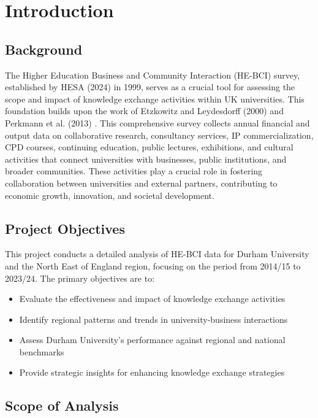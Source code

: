 \documentclass[journal,onecolumn, 10pt,draftclsnofoot]{IEEEtran}
\begin{document}
\section{Introduction}

\subsection{Background}

The Higher Education Business and Community Interaction (HE-BCI) survey, established by HESA (2024) \cite{hesa_he_bci_2024} in 1999, serves as a crucial tool for assessing the scope and impact of knowledge exchange activities within UK universities. This foundation builds upon the work of Etzkowitz and Leydesdorff (2000) \cite{etzkowitz2000dynamics} and Perkmann et al. (2013) \cite{perkmann2013academic}. This comprehensive survey collects annual financial and output data on collaborative research, consultancy services, IP commercialization, CPD courses, continuing education, public lectures, exhibitions, and cultural activities that connect universities with businesses, public institutions, and broader communities. These activities play a crucial role in fostering collaboration between universities and external partners, contributing to economic growth, innovation, and societal development.

\subsection{Project Objectives}

This project conducts a detailed analysis of HE-BCI data for Durham University and the North East of England region, focusing on the period from 2014/15 to 2023/24. The primary objectives are to:
\begin{itemize}
    \item Evaluate the effectiveness and impact of knowledge exchange activities
    \item Identify regional patterns and trends in university-business interactions
    \item Assess Durham University's performance against regional and national benchmarks
    \item Provide strategic insights for enhancing knowledge exchange strategies
\end{itemize}

\subsection{Scope of Analysis}
\end{document}

